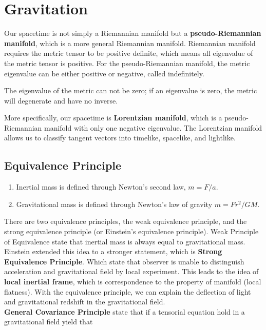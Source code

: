 \documentclass[12pt]{article}
\theoremstyle{mystyle}{\newtheorem{definition}{Definition}[subsection]}
\theoremstyle{mystyle}{\newtheorem{theorem}[definition]{Theorem}}
\theoremstyle{mystyle}{\newtheorem*{remark}{Remark}}
\theoremstyle{mystyle}{\newtheorem{example}{Example}[subsection]}
\theoremstyle{mystyle}{\newtheorem{examples}{Examples}[subsection]}
\theoremstyle{mystyle}{\newtheorem{cthm}{}[subsection]}
\begin{document}
\section{Gravitation}

Our spacetime is not simply a Riemannian manifold but a \textbf{pseudo-Riemannian manifold}, which is a more general Riemannian manifold.
Riemannian manifold requires the metric tensor to be positive definite, which means all eigenvalue of the metric tensor is positive.
For the pseudo-Riemannian manifold, the metric eigenvalue can be either positive or negative, called indefinitely.

\begin{remark}
  The eigenvalue of the metric can not be zero; if an eigenvalue is zero, the metric will degenerate and have no inverse.
\end{remark}

More specifically, our spacetime is \textbf{Lorentzian manifold}, which is a pseudo-Riemannian manifold with only one negative eigenvalue.
The Lorentzian manifold allows us to classify tangent vectors into timelike, spacelike, and lightlike.

\subsection{Equivalence Principle}
\begin{definition}
  \textbf{  }
  \begin{enumerate}
    \item Inertial mass is defined through Newton's second law, \(m = F/a\).
    \item Gravitational mass is defined through Newton's law of gravity \(m = Fr^2/GM\).
  \end{enumerate}
\end{definition}

There are two equivalence principles, the weak equivalence principle, and the strong equivalence principle
(or Einstein's equivalence principle). Weak Principle of Equivalence state that inertial mass is always equal to gravitational mass.
Einstein extended this idea to a stronger statement, which is \textbf{Strong Equivalence Principle}.
Which state that observer is unable to distinguish acceleration and gravitational field by local experiment.
This leads to the idea of \textbf{local inertial frame}, which is correspondence to the property of manifold (local flatness).
With the equivalence principle, we can explain the deflection of light and gravitational redshift in the gravitational field.\\
\textbf{General Covariance Principle} state that if a tensorial equation hold in a gravitational field yield that
\end{document}
